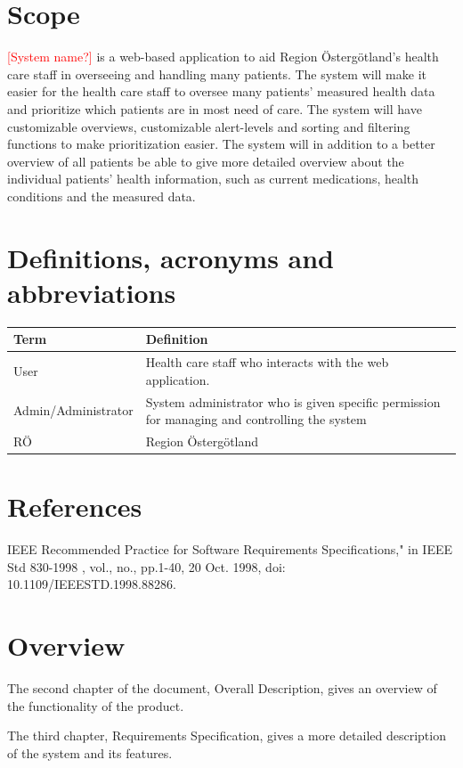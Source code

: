 \documentclass{scrreprt}
\begin{document}
\section{Scope}
\textcolor{red}{[System name?]} is a web-based application to aid Region Östergötland's health care staff in overseeing and handling many patients. The system will make it easier for the health care staff to oversee many patients' measured health data and prioritize which patients are in most need of care. The system will have customizable overviews, customizable alert-levels and sorting and filtering functions to make prioritization easier. The system will in addition to a better overview of all patients be able to give more detailed overview about the individual patients' health information, such as current medications, health conditions and the measured data. 


\section{Definitions, acronyms and abbreviations}
\begin{center}
\begin{tabularx}{\linewidth}{| l | X |}
 \hline
 \textbf{Term} & \textbf{Definition} \\ 
 \hline
  User  & Health care staff who interacts with the web application.  \\
  \hline
  Admin/Administrator & System administrator who is given specific permission for managing and controlling the system  \\ 
  \hline
  RÖ  & Region Östergötland  \\ 
  \hline
\end{tabularx}
\end{center}

\section{References}
IEEE Recommended Practice for Software Requirements Specifications," in IEEE Std 830-1998 , vol., no., pp.1-40, 20 Oct. 1998, doi: 10.1109/IEEESTD.1998.88286.

\section{Overview}
The second chapter of the document, Overall Description, gives an overview of the functionality of the product.


The third chapter, Requirements Specification, gives a more  detailed description of the system and its features. 
\end{document}
